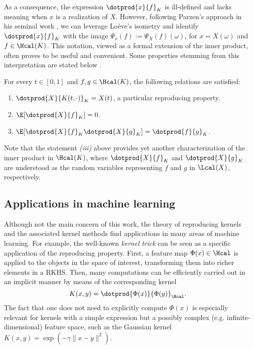 As a consequence, the expression \(\dotprod{x}{f}_K\) is ill-defined and lacks meaning when \(x\) is a realization of \(X\). However, following Parzen's approach in his seminal work \citep[e.g.][Th.~4E]{parzen1961approach}, we can leverage Loève's isometry and identify \(\dotprod{x}{f}_K \) with the image \( \Psi_x(f) := \Psi_X(f)(\omega)\), for \(x=X(\omega)\) and \(f\in \Hcal(K)\). This notation, viewed as a formal extension of the inner product, often proves to be useful and convenient. Some properties stemming from this interpretation are stated below \citep[see][p.~974]{parzen1961approach}.

\begin{proposition}
  For every \(t\in[0,1]\) and \(f, g \in \Hcal(K)\), the following relations are satisfied:
\begin{enumerate}
  \item \(\dotprod{X}{K(t, \cdot)}_K = X(t)\), a particular reproducing property.
  \item \(\E[\dotprod{X}{f}_K] = 0\).
  \item \(\E[\dotprod{X}{f}_K\dotprod{X}{g}_K] = \dotprod{f}{g}_K\).
\end{enumerate}
\end{proposition}
Note that the statement \textit{(iii)} above provides yet another characterization of the inner product in \(\Hcal(K)\), where \(\dotprod{X}{f}_K\) and \(\dotprod{X}{g}_K\) are understood as the random variables representing \(f\) and \(g\) in \(\Lcal(X)\), respectively.


\subsection*{Applications in machine learning}

Although not the main concern of this work, the theory of reproducing kernels and the associated kernel methods find applications in many areas of machine learning. For example, the well-known \textit{kernel trick} can be seen as a specific application of the reproducing property. First, a feature map \(\Phi(x) \in \Hcal\) is applied to the objects in the space of interest, transforming them into richer elements in a RKHS. Then, many computations can be efficiently carried out in an implicit manner by means of the corresponding kernel
\[
K(x, y)=\dotprod{\Phi(x)}{\Phi(y)}_{\Hcal}.
\]
The fact that one does not need to explicitly compute \(\Phi(x)\) is especially relevant for kernels with a simple expression but a possibly complex (e.g. infinite-dimensional) feature space, such as the Gaussian kernel \(K(x, y)=\exp(-\gamma\|x-y\|^2)\).

